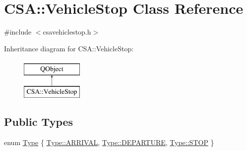 \hypertarget{classCSA_1_1VehicleStop}{}\section{C\+SA\+:\+:Vehicle\+Stop Class Reference}
\label{classCSA_1_1VehicleStop}


{\ttfamily \#include $<$csavehiclestop.\+h$>$}

Inheritance diagram for C\+SA\+:\+:Vehicle\+Stop\+:\begin{figure}[H]
\begin{center}
\leavevmode
\includegraphics[height=2.000000cm]{classCSA_1_1VehicleStop}
\end{center}
\end{figure}
\subsection*{Public Types}
\begin{DoxyCompactItemize}
\item 
enum \mbox{\hyperlink{classCSA_1_1VehicleStop_a7c2030d5a49808cb8e6fefaa691a76e0}{Type}} \{ \mbox{\hyperlink{classCSA_1_1VehicleStop_a7c2030d5a49808cb8e6fefaa691a76e0ad5f52d91ac49fd146727f4710767dd08}{Type\+::\+A\+R\+R\+I\+V\+AL}}, 
\mbox{\hyperlink{classCSA_1_1VehicleStop_a7c2030d5a49808cb8e6fefaa691a76e0ae7cc381a17e714e7ba15ef6f9858304e}{Type\+::\+D\+E\+P\+A\+R\+T\+U\+RE}}, 
\mbox{\hyperlink{classCSA_1_1VehicleStop_a7c2030d5a49808cb8e6fefaa691a76e0a615a46af313786fc4e349f34118be111}{Type\+::\+S\+T\+OP}}
 \}
\end{DoxyCompactItemize}
